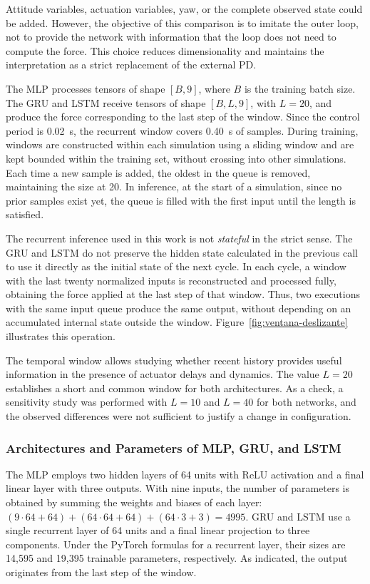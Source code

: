 Attitude variables, actuation variables, yaw, or the complete observed state could be added. However, the objective of this comparison is to imitate the outer loop, not to provide the network with information that the loop does not need to compute the force. This choice reduces dimensionality and maintains the interpretation as a strict replacement of the external PD.

The MLP processes tensors of shape $[B,9]$, where $B$ is the training batch size. The GRU and LSTM receive tensors of shape $[B,L,9]$, with $L=20$, and produce the force corresponding to the last step of the window. Since the control period is \SI{0.02}{s}, the recurrent window covers \SI{0.40}{s} of samples. During training, windows are constructed within each simulation using a sliding window and are kept bounded within the training set, without crossing into other simulations. Each time a new sample is added, the oldest in the queue is removed, maintaining the size at 20. In inference, at the start of a simulation, since no prior samples exist yet, the queue is filled with the first input until the length is satisfied.

The recurrent inference used in this work is not \emph{stateful} in the strict sense. The GRU and LSTM do not preserve the hidden state calculated in the previous call to use it directly as the initial state of the next cycle. In each cycle, a window with the last twenty normalized inputs is reconstructed and processed fully, obtaining the force applied at the last step of that window. Thus, two executions with the same input queue produce the same output, without depending on an accumulated internal state outside the window. Figure~\ref{fig:ventana-deslizante} illustrates this operation.

The temporal window allows studying whether recent history provides useful information in the presence of actuator delays and dynamics. The value $L=20$ establishes a short and common window for both architectures. As a check, a sensitivity study was performed with $L=10$ and $L=40$ for both networks, and the observed differences were not sufficient to justify a change in configuration.

\subsubsection*{Architectures and Parameters of MLP, GRU, and LSTM}

The MLP employs two hidden layers of 64 units with ReLU activation and a final linear layer with three outputs. With nine inputs, the number of parameters is obtained by summing the weights and biases of each layer: $(9\cdot64+64)+(64\cdot64+64)+(64\cdot3+3)=4995$. GRU and LSTM use a single recurrent layer of 64 units and a final linear projection to three components. Under the PyTorch formulas for a recurrent layer, their sizes are 14,595 and 19,395 trainable parameters, respectively. As indicated, the output originates from the last step of the window.

